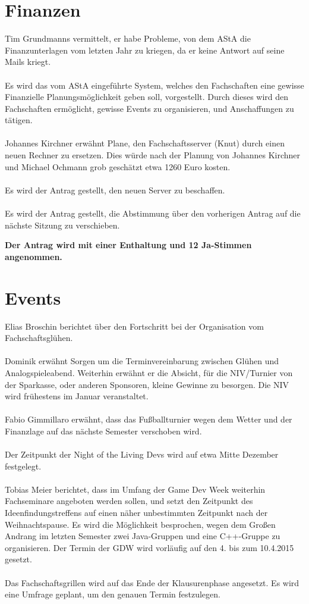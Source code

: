 \documentclass[a4paper, 11pt]{article} %
\begin{document}
\section{Finanzen}
Tim Grundmanns vermittelt, er habe Probleme, von dem AStA die Finanzunterlagen vom letzten Jahr zu kriegen, da er keine Antwort auf seine Mails kriegt.
\\\\
Es wird das vom AStA eingeführte System, welches den Fachschaften eine gewisse Finanzielle Planungsmöglichkeit geben soll, vorgestellt. Durch dieses wird den Fachschaften ermöglicht, gewisse Events zu organisieren, und Anschaffungen zu tätigen.
\\\\
Johannes Kirchner erwähnt Plane, den Fachschaftsserver (Knut) durch einen neuen Rechner zu ersetzen. Dies würde nach der Planung von Johannes Kirchner und Michael Ochmann grob geschätzt etwa 1260 Euro kosten.
\\\\
Es wird der Antrag gestellt, den neuen Server zu beschaffen.
\\\\
Es wird der Antrag gestellt, die Abstimmung über den vorherigen Antrag auf die nächste Sitzung zu verschieben.
\begin{center}
	\textbf{Der Antrag wird mit einer Enthaltung und 12 Ja-Stimmen angenommen.}
\end{center}

\section{Events}
Elias Broschin berichtet über den Fortschritt  bei der Organisation vom Fachschaftsglühen.
\\\\
Dominik erwähnt Sorgen um die Terminvereinbarung zwischen Glühen und Analogspieleabend.
Weiterhin erwähnt er die Absicht, für die NIV/Turnier von der Sparkasse, oder anderen Sponsoren, kleine Gewinne zu besorgen.
Die NIV wird frühestens im Januar veranstaltet.
\\\\
Fabio Gimmillaro erwähnt, dass das Fußballturnier wegen dem Wetter und der Finanzlage auf das nächste Semester verschoben wird.
\\\\
Der Zeitpunkt der Night of the Living Devs wird auf etwa Mitte Dezember festgelegt.
\\\\
Tobias Meier berichtet, dass im Umfang der Game Dev Week weiterhin Fachseminare angeboten werden sollen, und setzt den Zeitpunkt des Ideenfindungstreffens auf einen näher unbestimmten Zeitpunkt nach der Weihnachtspause.
Es wird die Möglichkeit besprochen, wegen dem Großen Andrang im letzten Semester zwei Java-Gruppen und eine C++-Gruppe zu organisieren. 
Der Termin der GDW wird vorläufig auf den 4. bis zum 10.4.2015 gesetzt.
\\\\
Das Fachschaftsgrillen wird auf das Ende der Klausurenphase angesetzt. Es wird eine Umfrage geplant, um den genauen Termin festzulegen.
\end{document}
